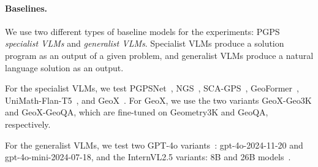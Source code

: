 

\paragraph{Baselines.}
We use two different types of baseline models for the experiments: PGPS \emph{specialist VLMs} and \emph{generalist VLMs}. Specialist VLMs produce a solution program as an output of a given problem, and generalist VLMs produce a natural language solution as an output.

For the specialist VLMs, we test PGPSNet~\citep{pgps}, NGS~\citep{geoqa}, SCA-GPS~\citep{scagps}, GeoFormer~\citep{unigeo}, UniMath-Flan-T5~\citep{unimath}, and GeoX~\citep{geox}. For GeoX, we use the two variants GeoX-Geo3K and GeoX-GeoQA, which are fine-tuned on Geometry3K and GeoQA, respectively.

For the generalist VLMs, we test two GPT-4o variants~\citep{gpt4o}: gpt-4o-2024-11-20 and gpt-4o-mini-2024-07-18, and the InternVL2.5 variants: 8B and 26B models~\citep{internvl2_5}.

